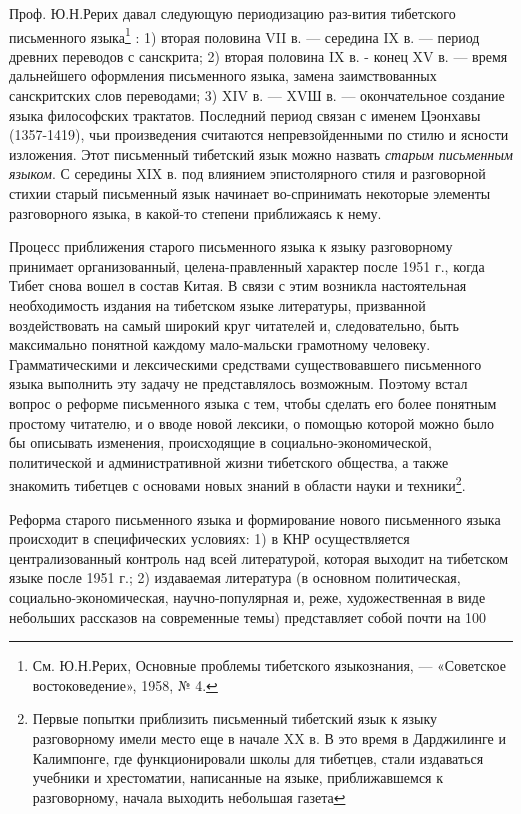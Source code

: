 Проф. Ю.Н.Рерих давал следующую периодизацию раз-вития тибетского письменного языка\footnote[4]{См. Ю.Н.Рерих, Основные проблемы тибетского языкознания, — «Советское востоковедение», 1958, № 4.} : 1) вторая половина VII в. — середина IX в. — период древних переводов с санскрита; 2) вторая половина IX в. - конец XV в. — время дальнейшего оформления письменного языка, замена заимствованных санскритских слов переводами; 3) XIV в. — XVШ в. — окончательное создание языка философских трактатов. Последний период связан с именем Цэонхавы (1357-1419), чьи произведения считаются непревзойденными по стилю и ясности изложения. Этот письменный тибетский язык можно назвать \emph{старым письменным языком}. С середины XIX в. под влиянием эпистолярного стиля и разговорной стихии старый письменный язык начинает во-спринимать некоторые элементы разговорного языка, в какой-то степени приближаясь к нему.

Процесс приближения старого письменного языка к языку разговорному принимает организованный, целена-правленный характер после 1951 г., когда Тибет снова вошел в состав Китая. В связи с этим возникла настоятельная необходимость издания на тибетском языке литературы, призванной воздействовать на самый широкий круг читателей и, следовательно, быть максимально понятной каждому мало-мальски грамотному человеку. Грамматическими и лексическими средствами существовавшего письменного языка выполнить эту задачу не представлялось возможным. Поэтому встал вопрос о реформе письменного языка с тем, чтобы сделать его более понятным простому читателю, и о вводе новой лексики, о помощью которой можно было бы описывать изменения, происходящие в социально-экономической, политической и административной жизни тибетского общества, а также знакомить тибетцев с основами новых знаний в области науки и техники\footnote[5]{Первые попытки приблизить письменный тибетский язык к языку разговорному имели место еще в начале XX в. В это время в Дарджилинге и Калимпонге, где функционировали школы для тибетцев, стали издаваться учебники и хрестоматии, написанные на языке, приближавшемся к разговорному, начала выходить небольшая газета}.

Реформа старого письменного языка и формирование нового письменного языка происходит в специфических условиях: 1) в КНР осуществляется централизованный контроль над всей литературой, которая выходит на тибетском языке после 1951 г.; 2) издаваемая литература (в основном политическая, социально-экономическая, научно-популярная и, реже, художественная в виде небольших рассказов на современные темы) представляет собой почти на 100%

